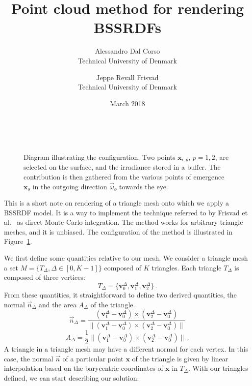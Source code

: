 \documentclass[10pt,a4paper]{article}
\title{Point cloud method for rendering BSSRDFs}
\date{March 2018}
\author{ Alessandro Dal Corso \\ Technical University of Denmark \and Jeppe Revall Frisvad \\ Technical University of Denmark
}
\begin{document}
\maketitle

\begin{figure}
\centering
   \def\svgwidth{0.8\textwidth}
    \\
\caption{Diagram illustrating the configuration. Two points $\mathbf{x}_{i,p}$, $p=1,2$, are selected on the surface, and the irradiance stored in a buffer. The contribution is then gathered from the various points of emergence $\mathbf{x}_o$ in the outgoing direction $\vec{\omega}_o$ towards the eye.}
\label{fig:vpt}
\end{figure}

\noindent This is a short note on rendering of a triangle mesh onto which we apply a BSSRDF model. It is a way to implement the technique referred to by Frisvad et al.~\cite{frisvad14directional} as direct Monte Carlo integration. The method works for arbitrary triangle meshes, and it is unbiased. The configuration of the method is illustrated in Figure~\ref{fig:vpt}.

We first define some quantities relative to our mesh. We consider a triangle mesh a set $M = \{T_\Delta, \Delta \in [0, K - 1] \}$ composed of $K$ triangles. Each triangle $T_\Delta$ is composed of three vertices:
\begin{equation*}
T_\Delta = \{ \mathbf{v}^\Delta_0, \mathbf{v}^\Delta_1, \mathbf{v}^\Delta_2 \} \, .
\end{equation*}
From these quantities, it straightforward to define two derived quantities, the normal $\vec{n}_\Delta$ and the area $A_\Delta$ of the triangle.
\begin{equation*}
\vec{n}_\Delta = \frac{(\mathbf{v}^\Delta_1 - \mathbf{v}^\Delta_0) \times (\mathbf{v}^\Delta_2 - \mathbf{v}^\Delta_0) }{ \|(\mathbf{v}^\Delta_1 - \mathbf{v}^\Delta_0) \times (\mathbf{v}^\Delta_2 - \mathbf{v}^\Delta_0)  \|}
\end{equation*}
\begin{equation*}
A_\Delta = \frac{1}{2} \|(\mathbf{v}^\Delta_1 - \mathbf{v}^\Delta_0) \times (\mathbf{v}^\Delta_2 - \mathbf{v}^\Delta_0) \| \, .
\end{equation*}
A triangle in a triangle mesh may have a different normal for each vertex. In this case, the normal $\vec{n}$ of a particular point $\mathbf{x}$ of the triangle is given by linear interpolation based on the barycentric coordinates of $\mathbf{x}$ in $T_\Delta$. With our triangles defined, we can start describing our solution.
\end{document}

